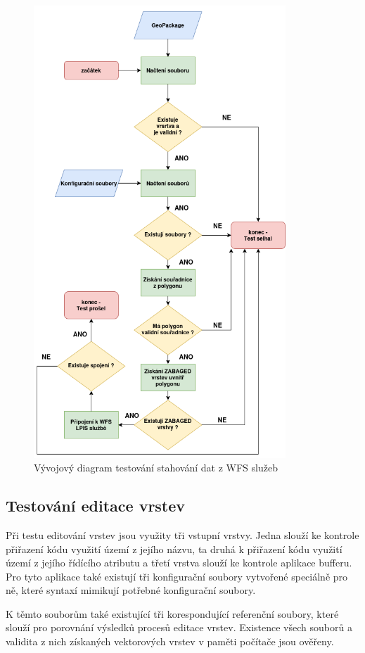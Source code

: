\documentclass[a4paper,oneside,12pt]{book}
\begin{document}
\begin{figure}[H] \label{obr18}
\centering
\includegraphics[height=17cm]{pictures/test1.png}
\caption{Vývojový diagram testování stahování dat z WFS služeb}
\label{fig:test1}
\end{figure}

\subsection{Testování editace vrstev} \label{test_edit}
\hspace{10mm} Při testu editování vrstev jsou využity tři vstupní vrstvy. Jedna slouží ke kontrole přiřazení kódu využití území z jejího názvu, ta druhá k přiřazení kódu využití území z jejího řídícího atributu a třetí vrstva slouží ke kontrole aplikace bufferu. Pro tyto aplikace také existují tři konfigurační soubory vytvořené speciálně pro ně, které syntaxí mimikují potřebné konfigurační soubory.

\hspace{10mm} K těmto souborům také existující tři korespondující referenční soubory, které slouží pro porovnání výsledků procesů editace vrstev. Existence všech souborů a validita z nich získaných vektorových vrstev v paměti počítače jsou ověřeny.
\end{document}
